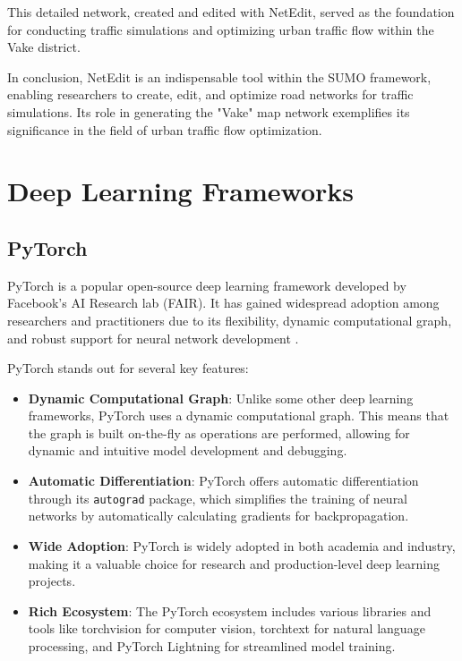 This detailed network, created and edited with NetEdit, served as the foundation for conducting traffic simulations and optimizing urban traffic flow within the Vake district.

In conclusion, NetEdit is an indispensable tool within the SUMO framework, enabling researchers to create, edit, and optimize road networks for traffic simulations. Its role in generating the "Vake" map network exemplifies its significance in the field of urban traffic flow optimization.


\section{Deep Learning Frameworks}
\subsection{PyTorch}

PyTorch is a popular open-source deep learning framework developed by Facebook's AI Research lab (FAIR). It has gained widespread adoption among researchers and practitioners due to its flexibility, dynamic computational graph, and robust support for neural network development \cite{pytorch_neurips}.

PyTorch stands out for several key features:

\begin{itemize}
    \item \textbf{Dynamic Computational Graph}: Unlike some other deep learning frameworks, PyTorch uses a dynamic computational graph. This means that the graph is built on-the-fly as operations are performed, allowing for dynamic and intuitive model development and debugging.
    
    \item \textbf{Automatic Differentiation}: PyTorch offers automatic differentiation through its \texttt{autograd} package, which simplifies the training of neural networks by automatically calculating gradients for backpropagation.
    
    \item \textbf{Wide Adoption}: PyTorch is widely adopted in both academia and industry, making it a valuable choice for research and production-level deep learning projects.
    
    \item \textbf{Rich Ecosystem}: The PyTorch ecosystem includes various libraries and tools like torchvision for computer vision, torchtext for natural language processing, and PyTorch Lightning for streamlined model training.
\end{itemize}


